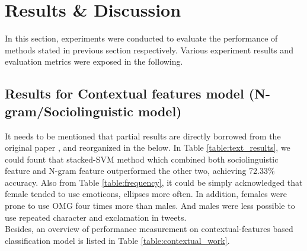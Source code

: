 \documentclass[runningheads]{llncs}
\begin{document}
	\section{Results \& Discussion}
	In this section, experiments were conducted to evaluate the performance of methods stated in previous section respectively. Various experiment results and evaluation metrics were exposed in the following. 
	
	\subsection{Results for Contextual features model (N-gram/Sociolinguistic model)}
	It needs to be mentioned that partial results are directly borrowed from the original paper \cite{rao2010classifying}, and reorganized in the below. In Table \ref{table:text_results}, we could fount that stacked-SVM method which combined both sociolinguistic feature and N-gram feature outperformed the other two, achieving 72.33\% accuracy. Also from Table  \ref{table:frequency}, it could be simply acknowledged that female tended to use emoticons, ellipses more often. In addition, females were prone to use OMG four times more than males. And males were less possible to use repeated character and exclamation in tweets.  
	\\
	Besides, an overview of performance measurement on contextual-features based classification model is listed in Table \ref{table:contextual_work}. 
	
\end{document}

